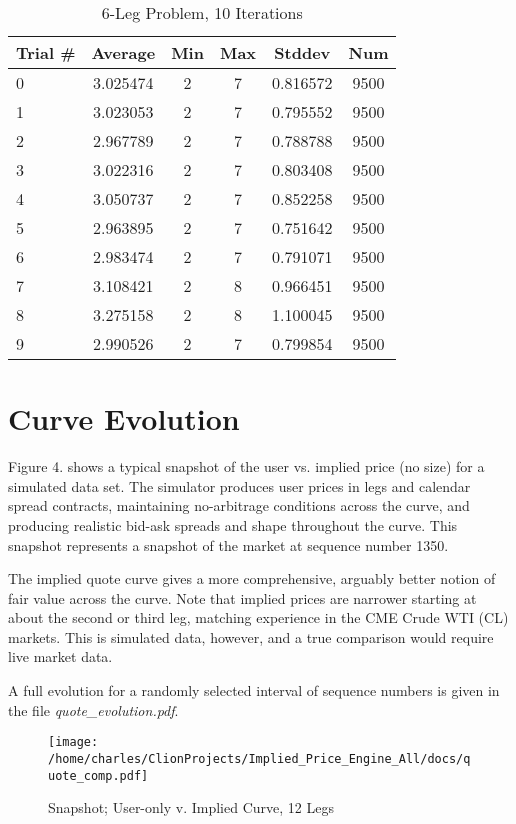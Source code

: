 \documentclass{article}
\begin{document}
\begin{table}
\centering
\begin{tabular}{|l|c|c|c|c|c|}
\hline
Trial \# & Average & Min & Max & Stddev & Num \\
\hline
0 & 3.025474 & 2 & 7 & 0.816572 & 9500 \\ 
1 & 3.023053 & 2 & 7 & 0.795552 & 9500 \\ 
2 & 2.967789 & 2 & 7 & 0.788788 & 9500 \\ 
3 & 3.022316 & 2 & 7 & 0.803408 & 9500 \\ 
4 & 3.050737 & 2 & 7 & 0.852258 & 9500 \\ 
5 & 2.963895 & 2 & 7 & 0.751642 & 9500 \\ 
6 & 2.983474 & 2 & 7 & 0.791071 & 9500 \\ 
7 & 3.108421 & 2 & 8 & 0.966451 & 9500 \\ 
8 & 3.275158 & 2 & 8 & 1.100045 & 9500 \\ 
9 & 2.990526 & 2 & 7 & 0.799854 & 9500 \\
\hline
\end{tabular}
\caption{6-Leg Problem, 10 Iterations}
\label{tab:template}
\end{table}

\clearpage
\section*{Curve Evolution}

Figure 4. shows a typical snapshot of the user vs. implied price (no size) for a simulated data set. The simulator produces user prices in legs and calendar spread contracts, maintaining no-arbitrage conditions across the curve, and producing realistic bid-ask spreads and shape throughout the curve. This snapshot represents a snapshot of the market at sequence number 1350.


The implied quote curve gives a more comprehensive, arguably better notion of fair value across the curve. Note that implied prices are narrower starting at about the second or third leg, matching experience in the CME Crude WTI (CL) markets. This is simulated data, however, and a true comparison would require live market data.


A full evolution for a randomly selected interval of sequence numbers is given in the file {\it quote{\_}evolution.pdf}.

\begin{figure}
\texttt{[image: /home/charles/ClionProjects/Implied\_Price\_Engine\_All/docs/quote\_comp.pdf]}
\caption{Snapshot; User-only v. Implied Curve, 12 Legs}
\end{figure}
\end{document}
